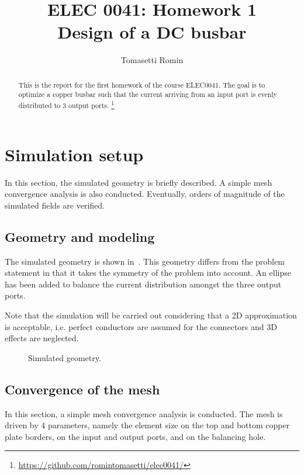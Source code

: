 \documentclass[]{article}
\title{%
    ELEC 0041: Homework 1\\
    \large Design of a DC busbar
}
\author{Tomasetti Romin}
\begin{document}
\maketitle

\begin{abstract}
    This is the report for the first homework of the course ELEC0041.
    The goal is to optimize a copper busbar such that the current arriving from an input port
    is evenly distributed to 3 output ports.
    \footnote{\url{https://github.com/romintomasetti/elec0041/}}
\end{abstract}

\section{Simulation setup}

In this section, the simulated geometry is briefly described.
A simple mesh convergence analysis is also conducted.
Eventually, orders of magnitude of the simulated fields are verified.

\subsection{Geometry and modeling}

The simulated geometry is shown in~.
This geometry differs from the problem statement in that it takes the symmetry of the problem into account.
An ellipse has been added to balance the current distribution amongst the three output ports.

Note that the simulation will be carried out considering that a 2D approximation is acceptable, i.e.
perfect conductors are assumed for the connectors and 3D effects are neglected.

\begin{figure}[h]
    \centering
    
    \caption{Simulated geometry.}
    \label{figure:geometry}
\end{figure}

\subsection{Convergence of the mesh}

In this section, a simple mesh convergence analysis is conducted.
The mesh is driven by 4 parameters, namely the element size on the top and bottom copper plate borders,
on the input and output ports, and on the balancing hole.
\end{document}
